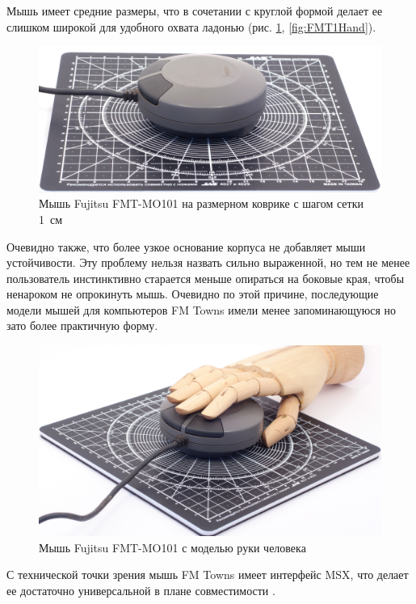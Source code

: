 \documentclass[11pt, a4paper]{article}
\begin{document}
Мышь имеет средние размеры, что в сочетании с круглой формой делает ее слишком широкой \cite{twinklemagic} для удобного охвата ладонью (рис. \ref{fig:FMT1Size}, \ref{fig:FMT1Hand}).

\begin{figure}[h]
    \centering
    \includegraphics[scale=0.45]{1989_fujitsu_fmt_mo101_mouse/size_30.jpg}
    \caption{Мышь Fujitsu FMT-MO101 на размерном коврике с шагом сетки 1~см}
    \label{fig:FMT1Size}
\end{figure}

Очевидно также, что более узкое основание корпуса не добавляет мыши устойчивости. Эту проблему нельзя назвать сильно выраженной, но тем не менее пользователь инстинктивно старается меньше опираться на боковые края, чтобы ненароком не опрокинуть мышь. Очевидно по этой причине, последующие модели мышей для компьютеров FM Towns имели менее запоминающуюся но зато более практичную форму.

\begin{figure}[h]
    \centering
    \includegraphics[scale=0.45]{1989_fujitsu_fmt_mo101_mouse/hand_30.jpg}
    \caption{Мышь Fujitsu FMT-MO101 с моделью руки человека}
    \label{fig:FMT1hand}
\end{figure}

С технической точки зрения мышь FM Towns имеет интерфейс MSX, что делает ее достаточно универсальной в плане совместимости \cite{tepatti}.
\end{document}
